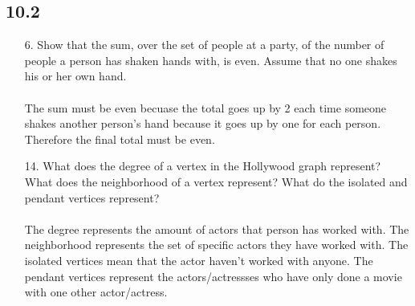 \subsection{10.2}
\begin{itemize}
      \item[6.] Show that the sum, over the set of people at a party, of
            the number of people a person has shaken hands with, is
            even. Assume that no one shakes his or her own hand. \\
            \answer \\
            The sum must be even becuase the total goes up by 2 each time someone shakes
            another person's hand because it goes up by one for each person. Therefore
            the final total must be even.

      \item[14.] What does the degree of a vertex in the Hollywood graph
            represent? What does the neighborhood of a vertex represent?
            What do the isolated and pendant vertices represent? \\
            \answer \\
            The degree represents the amount of actors that person has worked with.
            The neighborhood represents the set of specific actors they have worked
            with. The isolated vertices mean that the actor haven't worked with
            anyone. The pendant vertices represent the actors/actressses who have
            only done a movie with one other actor/actress.


\end{itemize}
